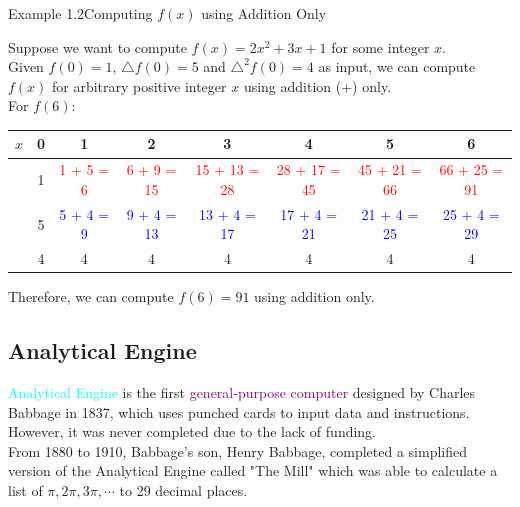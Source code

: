 \documentclass{book}
\begin{document}
\newpage
\begin{egBox}{Example 1.2}{Computing $f(x)$ using Addition Only}
    \raggedright
    Suppose we want to compute $f(x) = 2x^2 + 3x + 1$ for some integer $x$.\\
    Given $f(0) = 1$, $\triangle f(0) = 5$ and $\triangle^2 f(0) = 4$ as input, we can compute $f(x)$ for arbitrary positive integer $x$ using addition (+) only.\\
    For $f(6)$:
    \begin{center}
        \begin{tabular}{|c|c|c|c|c|c|c|c|}
            \hline
            \rowcolor{lightblue}
            $x$ & 0 & 1 & 2 & 3 & 4 & 5 & 6\\
            \hline
            \cellcolor{lightgreen}{$f(x)$} & 1 & \textcolor{red}{1 + 5 = 6} & \textcolor{red}{6 + 9 = 15} & \textcolor{red}{15 + 13 = 28} & \textcolor{red}{28 + 17 = 45} & \textcolor{red}{45 + 21 = 66} & \textcolor{red}{66 + 25 = 91}\\
            \hline
            \cellcolor{lightgreen}{$\triangle f(x)$} & 5 & \textcolor{blue}{5 + 4 = 9} & \textcolor{blue}{9 + 4 = 13} & \textcolor{blue}{13 + 4 = 17} & \textcolor{blue}{17 + 4 = 21} & \textcolor{blue}{21 + 4 = 25} & \textcolor{blue}{25 + 4 = 29}\\
            \hline
            \cellcolor{lightgreen}{$\triangle^2 f(x)$} & 4 & 4 & 4 & 4 & 4 & 4 & 4\\
            \hline
        \end{tabular}
    \end{center}
    Therefore, we can compute $f(6) = 91$ using addition only.\\
\end{egBox}
\subsection{Analytical Engine}
\raggedright
\textcolor{cyan}{Analytical Engine} is the first \textcolor{purple}{general-purpose computer} designed by Charles Babbage in 1837, which uses punched cards to input data and instructions.\\
However, it was never completed due to the lack of funding.\\
From 1880 to 1910, Babbage's son, Henry Babbage, completed a simplified version of the Analytical Engine called "The Mill" which was able to calculate a list of $\pi, 2\pi, 3\pi, \cdots$ to 29 decimal places.\\
\end{document}
